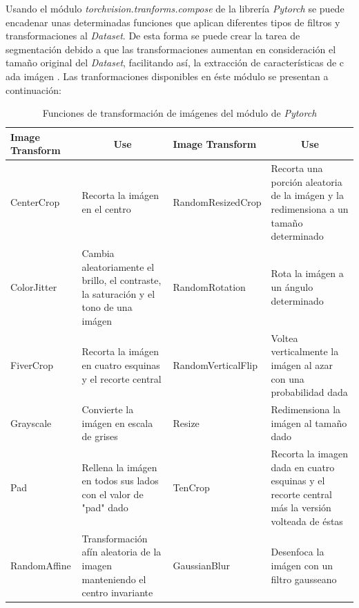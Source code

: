 			Usando el módulo \textit{torchvision.tranforms.compose} de la librería \textit{Pytorch} se puede encadenar unas determinadas funciones que aplican diferentes tipos de filtros y transformaciones al \textit{Dataset}. De esta forma se puede crear la tarea de segmentación debido a que las transformaciones aumentan en consideración el tamaño original del \textit{Dataset}, facilitando así, la extracción de características de c ada imágen \cite{Pytorch}. Las tranformaciones disponibles en éste módulo se presentan a continuación:
			
			\begin{table}[ht]
				\centering
				\begin{tabular}{|p{4cm}|p{4cm}|p{4cm}|p{4cm}|}
					\hline
					Image Transform       & \multicolumn{1}{c|}{Use}                                                               & Image Transform       & \multicolumn{1}{c|}{Use}                                                                        \\ \hline
					CenterCrop            & Recorta la imágen en el centro                                                         & RandomResizedCrop     & Recorta una porción aleatoria de la imágen y la redimensiona a un tamaño determinado            \\ \hline
					ColorJitter           & Cambia aleatoriamente el brillo, el contraste, la saturación y el tono de una imágen   & RandomRotation        & Rota la imágen a un ángulo determinado                                                          \\ \hline
					FiverCrop              & Recorta la imágen en cuatro esquinas y el recorte central                              & RandomVerticalFlip    & Voltea verticalmente la imágen al azar con una probabilidad dada                                \\ \hline
					Grayscale             & Convierte la imágen en escala de grises                                                & Resize                & Redimensiona la imágen al tamaño dado                                                           \\ \hline
					Pad                   & Rellena la imágen en todos sus lados con el valor de "pad" dado                        & TenCrop               & Recorta la imagen dada en cuatro esquinas y el recorte central más la versión volteada de éstas \\ \hline
					RandomAffine          & Transformación afín aleatoria de la imagen manteniendo el centro invariante            & GaussianBlur          & Desenfoca la imágen con un filtro gausseano                                                                                                                                                     \\ \hline
				\end{tabular}
				\caption{Funciones de transformación de imágenes del módulo de \textit{Pytorch}}
				\label{table:Filters1}
			\end{table}
			
